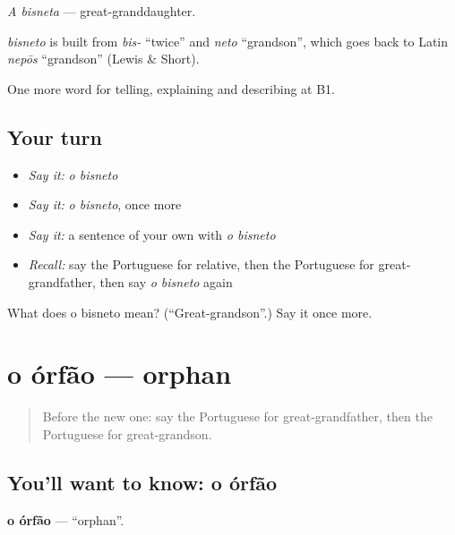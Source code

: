 \emph{A bisneta} — great-granddaughter.

\begin{cousinweb}
\emph{bisneto} is built from \emph{bis-} \textquotedblleft{}twice\textquotedblright{} and \emph{neto} \textquotedblleft{}grandson\textquotedblright{}, which goes back to Latin \emph{nepōs} \textquotedblleft{}grandson\textquotedblright{} (Lewis \& Short).
\end{cousinweb}

\begin{grammarlens}[title={What you've built}]
One more word for telling, explaining and describing at B1.
\end{grammarlens}

\subsection*{Your turn}
\begin{itemize}
\raggedright
  \item \emph{Say it:} \emph{o bisneto}
  \item \emph{Say it:} \emph{o bisneto}, once more
  \item \emph{Say it:} a sentence of your own with \emph{o bisneto}
  \item \emph{Recall:} say the Portuguese for relative, then the Portuguese for great-grandfather, then say \emph{o bisneto} again
\end{itemize}

\begin{tcolorbox}[breakable,colback=teal!4,colframe=teal!35!black,title={Before you move on}]
What does o bisneto mean? (\textquotedblleft{}Great-grandson\textquotedblright{}.) Say it once more.
\end{tcolorbox}
\section[o órfão]{o órfão — orphan}

\label{lesson:PT-C493-orfao}



\begin{quote}
Before the new one: say the Portuguese for great-grandfather, then the Portuguese for great-grandson.
\end{quote}

\subsection*{You'll want to know: o órfão}
\textbf{o órfão} — \textquotedblleft{}orphan\textquotedblright{}.

